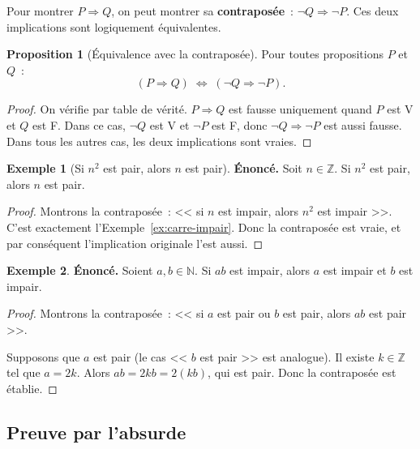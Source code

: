 \documentclass[12pt,a4paper,openany]{book}
\theoremstyle{definition}
\newtheorem{proposition}{Proposition}[chapter]
\newtheorem{exemple}{Exemple}[chapter]
\newcommand{\N}{\mathbb{N}}
\newcommand{\Z}{\mathbb{Z}}
\begin{document}
Pour montrer $P \Rightarrow Q$, on peut montrer sa \textbf{contraposée}~: $\lnot Q \Rightarrow \lnot P$. Ces deux implications sont logiquement équivalentes.

\begin{proposition}[Équivalence avec la contraposée]\label{prop:equiv-contraposee}
  Pour toutes propositions $P$ et $Q$~:
  \[
    (P \Rightarrow Q) \;\Leftrightarrow\; (\lnot Q \Rightarrow \lnot P).
  \]
\end{proposition}

\begin{proof}
  On vérifie par table de vérité. $P \Rightarrow Q$ est fausse uniquement quand $P$ est V et $Q$ est F. Dans ce cas, $\lnot Q$ est V et $\lnot P$ est F, donc $\lnot Q \Rightarrow \lnot P$ est aussi fausse. Dans tous les autres cas, les deux implications sont vraies.
\end{proof}

\begin{exemple}[Si $n^2$ est pair, alors $n$ est pair]\label{ex:carre-pair}
  \textbf{Énoncé.} Soit $n \in \Z$. Si $n^2$ est pair, alors $n$ est pair.

  \begin{proof}
    Montrons la contraposée~: << si $n$ est impair, alors $n^2$ est impair >>. C'est exactement l'Exemple~\ref{ex:carre-impair}. Donc la contraposée est vraie, et par conséquent l'implication originale l'est aussi.
  \end{proof}
\end{exemple}

\begin{exemple}\label{ex:contraposee-div}
  \textbf{Énoncé.} Soient $a, b \in \N$. Si $ab$ est impair, alors $a$ est impair et $b$ est impair.

  \begin{proof}
    Montrons la contraposée~: << si $a$ est pair ou $b$ est pair, alors $ab$ est pair >>.

    Supposons que $a$ est pair (le cas << $b$ est pair >> est analogue). Il existe $k \in \Z$ tel que $a = 2k$. Alors $ab = 2kb = 2(kb)$, qui est pair. Donc la contraposée est établie.
  \end{proof}
\end{exemple}

\subsection{Preuve par l'absurde}
\label{subsec:absurde}
\end{document}
